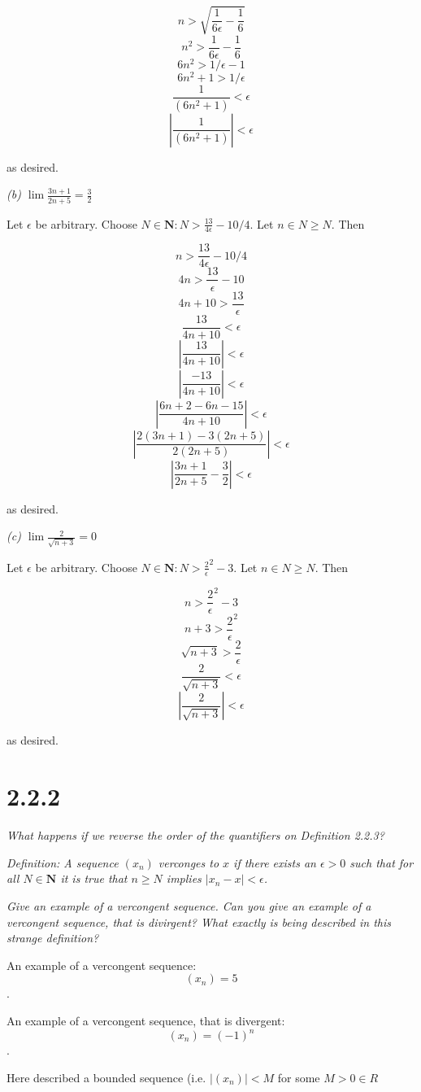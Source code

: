 \documentclass[11pt,oneside,titlepage]{book}
\begin{document}
$$n > \sqrt{\frac{1}{6 \epsilon} - \frac{1}{6}}$$
$$n ^ 2  > \frac{1}{6 \epsilon} - \frac{1}{6}$$
$$6 n ^ 2  > 1/\epsilon - 1$$
$$6 n ^ 2 + 1 > 1/\epsilon$$
$$\frac{1}{(6 n ^ 2 + 1)} < \epsilon$$
$$|\frac{1}{(6 n ^ 2 + 1)}| < \epsilon$$

as desired.

\textit{(b) $\lim\frac{3n + 1}{2n + 5} = \frac{3}{2}$}

Let $\epsilon$ be arbitrary. Choose
$N \in \textbf{N}: N > \frac{13}{4 \epsilon} - 10/4$. Let $n \in N \geq N$. Then

$$ n > \frac{13}{4 \epsilon} - 10/4$$
$$ 4n > \frac{13}{\epsilon} - 10$$
$$ 4n + 10 > \frac{13}{\epsilon} $$
$$ \frac{13}{4n + 10} < \epsilon $$
$$ |\frac{13}{4n + 10}| < \epsilon $$
$$ |\frac{-13}{4n + 10}| < \epsilon $$
$$ |\frac{6n + 2 - 6n - 15}{4n + 10}| < \epsilon $$
$$ |\frac{2(3n + 1) - 3(2n + 5)}{2(2n + 5)}| < \epsilon $$
$$ |\frac{3n + 1}{2n + 5} - \frac{3}{2}| < \epsilon $$

as desired.

\textit{(c) $\lim\frac{2}{\sqrt{n + 3}} = 0$}

Let $\epsilon$ be arbitrary. Choose
$N \in \textbf{N}: N > {\frac{2}{\epsilon}}^2 - 3$. Let $n \in N \geq N$. Then

$$n> {\frac{2}{\epsilon}}^2 - 3$$
$$n + 3 > {\frac{2}{\epsilon}}^2$$
$$\sqrt{n + 3} > \frac{2}{\epsilon}$$
$$\frac{2}{\sqrt{n + 3}} < \epsilon$$
$$|\frac{2}{\sqrt{n + 3}}| < \epsilon$$

as desired.

\section*{2.2.2}
\textit{What happens if we reverse the order of the quantifiers on Definition 2.2.3?}

\textit{Definition: A sequence $(x_n)$ verconges to $x$ if there exists an $\epsilon > 0$
  such that for all $N \in \textbf{N}$ it is true that $n \geq N$ implies $|x_n - x| <
  \epsilon$.}

\textit{Give an example of a vercongent sequence. Can you give an example of a vercongent
  sequence, that is divirgent? What exactly is being described in this strange definition?}

An example of a vercongent sequence:
$$(x_n) = 5$$.

An example of a vercongent sequence, that is divergent:
$$(x_n) = (-1)^n$$.

Here described a bounded sequence (i.e. $|(x_n)| < M$  for some $M > 0\in R$
\end{document}
